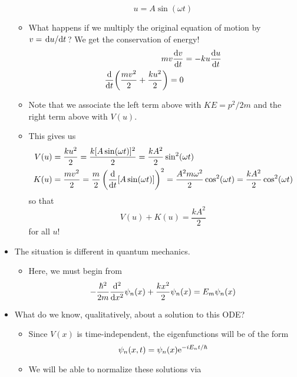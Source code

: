 \documentclass[../notes.tex]{subfiles}
\begin{document}
\begin{itemize}
\begin{itemize}
\begin{equation*}
            u = A\sin(\omega t)
        \end{equation*}
        \item What happens if we multiply the original equation of motion by $v=\dv*{u}{t}$? We get the conservation of energy!
        \begin{align*}
            mv\dv{v}{t} &= -ku\dv{u}{t}\\
            \dv{t}(\frac{mv^2}{2}+\frac{ku^2}{2}) = 0
        \end{align*}
        \item Note that we associate the left term above with $KE=p^2/2m$ and the right term above with $V(u)$.
        \item This gives us
        \begin{align*}
            V(u) &= \frac{ku^2}{2}
                = \frac{k[A\sin(\omega t)]^2}{2}
                = \frac{kA^2}{2}\sin^2(\omega t)\\
            K(u) &= \frac{mv^2}{2}
                = \frac{m}{2}\left( \dv{t}[A\sin(\omega t)] \right)^2
                = \frac{A^2m\omega^2}{2}\cos^2(\omega t)
                = \frac{kA^2}{2}\cos^2(\omega t)
        \end{align*}
        so that
        \begin{equation*}
            V(u)+K(u) = \frac{kA^2}{2}
        \end{equation*}
        for all $u$!
    \end{itemize}
    \item The situation is different in quantum mechanics.
    \begin{itemize}
        \item Here, we must begin from
        \begin{equation*}
            -\frac{\hbar^2}{2m}\dv[2]{x}\psi_n(x)+\frac{kx^2}{2}\psi_n(x) = E_m\psi_n(x)
        \end{equation*}
    \end{itemize}
    \item What do we know, qualitatively, about a solution to this ODE?
    \begin{itemize}
        \item Since $V(x)$ is time-independent, the eigenfunctions will be of the form
        \begin{equation*}
            \psi_n(x,t) = \psi_n(x)\e[-iE_nt/\hbar]
        \end{equation*}
        \item We will be able to normalize these solutions via

\end{itemize}
\end{itemize}
\end{document}
